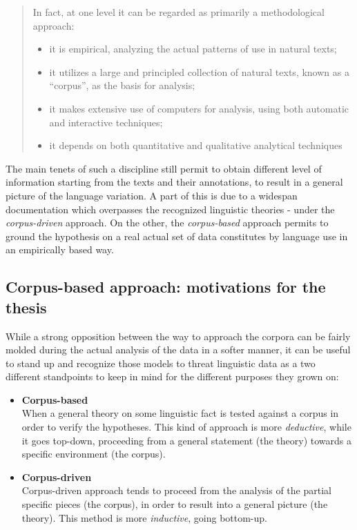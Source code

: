 \documentclass[a4paper,twoside,12pt,chapterprefix=false,bibliography=totocnumbered,listof=flat]{scrbook}
\providecommand{\tightlist}{%
  \setlength{\itemsep}{0pt}\setlength{\parskip}{0pt}}
\theoremstyle{definition}
\theoremstyle{definition}
\theoremstyle{definition}
\theoremstyle{remark}
\begin{document}
\begin{quote}
In fact, at one level it can be regarded as primarily a methodological
approach:

\begin{itemize}
\tightlist
\item
  it is empirical, analyzing the actual patterns of use in natural
  texts;
\item
  it utilizes a large and principled collection of natural texts, known
  as a \enquote{corpus}, as the basis for analysis;
\item
  it makes extensive use of computers for analysis, using both automatic
  and interactive techniques;
\item
  it depends on both quantitative and qualitative analytical techniques
\end{itemize}

\citep{biber1998}
\end{quote}

The main tenets of such a discipline still permit to obtain different
level of information starting from the texts and their annotations, to
result in a general picture of the language variation. A part of this is
due to a widespan documentation which overpasses the recognized
linguistic theories - under the \emph{corpus-driven} approach. On the
other, the \emph{corpus-based} approach permits to ground the hypothesis
on a real actual set of data constitutes by language use in an
empirically based way.

\subsection{Corpus-based approach: motivations for the
thesis}\label{corpus-based-approach-motivations-for-the-thesis}

While a strong opposition between the way to approach the corpora can be
fairly molded during the actual analysis of the data in a softer manner,
it can be useful to stand up and recognize those models to threat
linguistic data as a two different standpoints to keep in mind for the
different purposes they grown on:

\begin{itemize}
\item
  \textbf{Corpus-based}\\
  When a general theory on some linguistic fact is tested against a
  corpus in order to verify the hypotheses. This kind of approach is
  more \emph{deductive}, while it goes top-down, proceeding from a
  general statement (the theory) towards a specific environment (the
  corpus).
\item
  \textbf{Corpus-driven}\\
  Corpus-driven approach tends to proceed from the analysis of the
  partial specific pieces (the corpus), in order to result into a
  general picture (the theory). This method is more \emph{inductive},
  going bottom-up.
\end{itemize}
\end{document}
